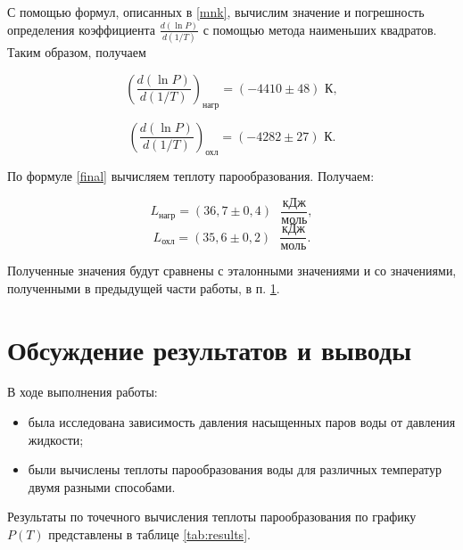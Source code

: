 \documentclass[a4paper,12pt]{article} %
\begin{document}
С помощью формул, описанных в \ref{mnk}, вычислим значение и погрешность определения коэффициента $ \displaystyle \frac{d(\ln P)}{d(1/T)} $ с помощью метода наименьших квадратов. Таким образом, получаем

\[ \left(\frac{d(\ln P)}{d(1/T)}\right)_\text{нагр} = \left(-4410\pm48\right)\text{ К}, \]

\[ \left(\frac{d(\ln P)}{d(1/T)}\right)_\text{охл} = \left(-4282\pm27\right)\text{ К}. \]

По формуле \eqref{final} вычисляем теплоту парообразования. Получаем:

\[ L_\text{нагр} = \left(36,7 \pm 0,4\right) \text{ } \frac{\text{кДж}}{\text{моль}}, \]
\[ L_\text{охл} = \left(35,6 \pm 0,2\right) \text{ } \frac{\text{кДж}}{\text{моль}}. \]

Полученные значения будут сравнены с эталонными значениями и со значениями, полученными в предыдущей части работы, в п. \ref{res}.

\section{Обсуждение результатов и выводы}
\label{res}

В ходе выполнения работы:

\begin{itemize}
	\item была исследована зависимость давления насыщенных паров воды от давления жидкости;
	\item были вычислены теплоты парообразования воды для различных температур двумя разными способами.
\end{itemize}

Результаты по точечного вычисления теплоты парообразования по графику $ P(T) $ представлены в таблице \ref{tab:results}.
\end{document}
